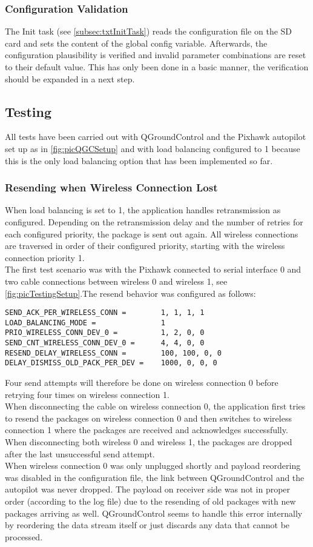 \subsubsection{Configuration Validation}
The Init task (see \autoref{subsec:txtInitTask}) reads the configuration file on the SD card and sets the content of the global config variable. Afterwards, the configuration plausibility is verified and invalid parameter combinations are reset to their default value. This has only been done in a basic manner, the verification should be expanded in a next step.
%
%
%
%
%
%
%
%
%
%
%
\subsection{Testing}
All tests have been carried out with QGroundControl and the Pixhawk autopilot set up as in \autoref{fig:picQGCSetup} and with load balancing configured to 1 because this is the only load balancing option that has been implemented so far.
%
\subsubsection{Resending when Wireless Connection Lost}
%
When load balancing is set to 1, the application handles retransmission as configured. Depending on the retransmission delay and the number of retries for each configured priority, the package is sent out again. All wireless connections are traversed in order of their configured priority, starting with the wireless connection priority 1.\\
The first test scenario was with the Pixhawk connected to serial interface 0 and two cable connections between wireless 0 and wireless 1, see \autoref{fig:picTestingSetup}.The resend behavior was configured as follows:
\begin{lstlisting}
SEND_ACK_PER_WIRELESS_CONN =		1, 1, 1, 1
LOAD_BALANCING_MODE =				1
PRIO_WIRELESS_CONN_DEV_0 =			1, 2, 0, 0
SEND_CNT_WIRELESS_CONN_DEV_0 =		4, 4, 0, 0
RESEND_DELAY_WIRELESS_CONN =		100, 100, 0, 0
DELAY_DISMISS_OLD_PACK_PER_DEV =	1000, 0, 0, 0
\end{lstlisting}
Four send attempts will therefore be done on wireless connection 0 before retrying four times on wireless connection 1.\\
When disconnecting the cable on wireless connection 0, the application first tries to resend the packages on wireless connection 0 and then switches to wireless connection 1 where the packages are received and acknowledges successfully.\\
When disconnecting both wireless 0 and wireless 1, the packages are dropped after the last unsuccessful send attempt.\\
When wireless connection 0 was only unplugged shortly and payload reordering was disabled in the configuration file, the link between QGroundControl and the autopilot was never dropped. The payload on receiver side was not in proper order (according to the log file) due to the resending of old packages with new packages arriving as well. QGroundControl seems to handle this error internally by reordering the data stream itself or just discards any data that cannot be processed.
%
